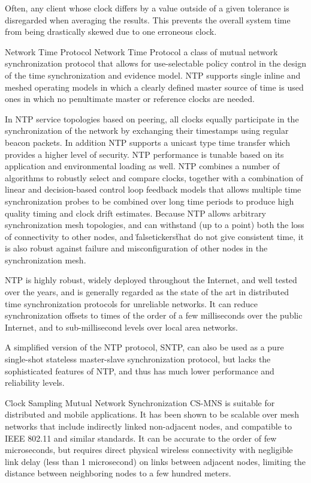 Often, any client whose clock differs by a value outside of a given tolerance is
disregarded when averaging the results. This prevents the overall system time
from being drastically skewed due to one erroneous clock.

Network Time Protocol
Network Time Protocol a class of mutual network synchronization protocol that
allows for use-selectable policy control in the design of the time synchronization
and evidence model. NTP supports single inline and meshed operating models in
which a clearly defined master source of time is used ones in which no penultimate
master or reference clocks are needed.

In NTP service topologies based on peering, all clocks equally participate in
the synchronization of the network by exchanging their timestamps using regular
beacon packets. In addition NTP supports a unicast type time transfer which
provides a higher level of security. NTP performance is tunable based on its
application and environmental loading as well. NTP combines a number of
algorithms to robustly select and compare clocks, together with a combination of
linear and decision-based control loop feedback models that allows multiple time
synchronization probes to be combined over long time periods to produce high
quality timing and clock drift estimates. Because NTP allows arbitrary
synchronization mesh topologies, and can withstand (up to a point) both the loss
of connectivity to other nodes, and \"falsetickers\" that do not give consistent
time, it is also robust against failure and misconfiguration of other nodes in
the synchronization mesh.

NTP is highly robust, widely deployed throughout the Internet, and well tested
over the years, and is generally regarded as the state of the art in distributed
time synchronization protocols for unreliable networks. It can reduce synchronization
offsets to times of the order of a few milliseconds over the public Internet,
and to sub-millisecond levels over local area networks.

A simplified version of the NTP protocol, SNTP, can also be used as a pure
single-shot stateless master-slave synchronization protocol, but lacks the
sophisticated features of NTP, and thus has much lower performance and reliability
levels.

Clock Sampling Mutual Network Synchronization
CS-MNS is suitable for distributed and mobile applications. It has been shown to
be scalable over mesh networks that include indirectly linked non-adjacent nodes,
and compatible to IEEE 802.11 and similar standards. It can be accurate to the order
of few microseconds, but requires direct physical wireless connectivity with
negligible link delay (less than 1 microsecond) on links between adjacent nodes,
limiting the distance between neighboring nodes to a few hundred meters.


